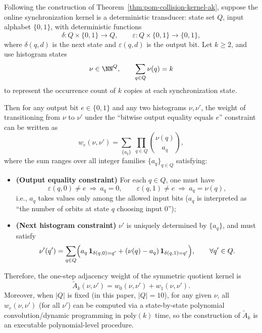 \begin{proposition}\label{prop:pom-ak-symmetric-transition-poly}
Following the construction of Theorem~\ref{thm:pom-collision-kernel-ak}, suppose the online synchronization kernel is a deterministic transducer: state set $Q$, input alphabet $\{0,1\}$, with deterministic functions
$$
\delta:Q\times\{0,1\}\to Q,\qquad \varepsilon:Q\times\{0,1\}\to\{0,1\},
$$
where $\delta(q,d)$ is the next state and $\varepsilon(q,d)$ is the output bit. Let $k\ge 2$, and use histogram states
$$
\nu\in\NN^{Q},\qquad \sum_{q\in Q}\nu(q)=k
$$
to represent the occurrence count of $k$ copies at each synchronization state.

Then for any output bit $e\in\{0,1\}$ and any two histograms $\nu,\nu'$, the weight of transitioning from $\nu$ to $\nu'$ under the ``bitwise output equality equals $e$'' constraint can be written as
$$
w_e(\nu,\nu')
=
\sum_{\{a_q\}}
\ \prod_{q\in Q}\binom{\nu(q)}{a_q},
$$
where the sum ranges over all integer families $\{a_q\}_{q\in Q}$ satisfying:
\begin{itemize}
  \item \textbf{(Output equality constraint)} For each $q\in Q$, one must have
  $$
  \varepsilon(q,0)\neq e\ \Rightarrow\ a_q=0,\qquad
  \varepsilon(q,1)\neq e\ \Rightarrow\ a_q=\nu(q),
  $$
  i.e., $a_q$ takes values only among the allowed input bits ($a_q$ is interpreted as ``the number of orbits at state $q$ choosing input $0$'');
  \item \textbf{(Next histogram constraint)} $\nu'$ is uniquely determined by $\{a_q\}$, and must satisfy
  $$
  \nu'(q')
  =
  \sum_{q\in Q}\Bigl(
  a_q\,\mathbf{1}_{\delta(q,0)=q'}+(\nu(q)-a_q)\,\mathbf{1}_{\delta(q,1)=q'}
  \Bigr),
  \qquad \forall q'\in Q.
  $$
\end{itemize}
Therefore, the one-step adjacency weight of the symmetric quotient kernel is
$$
\widetilde A_k(\nu,\nu')=w_0(\nu,\nu')+w_1(\nu,\nu').
$$
Moreover, when $|Q|$ is fixed (in this paper, $|Q|=10$), for any given $\nu$, all $w_e(\nu,\nu')$ (for all $\nu'$) can be computed via a state-by-state polynomial convolution/dynamic programming in $\mathrm{poly}(k)$ time, so the construction of \(\widetilde A_k\) is an executable polynomial-level procedure.
\end{proposition}
